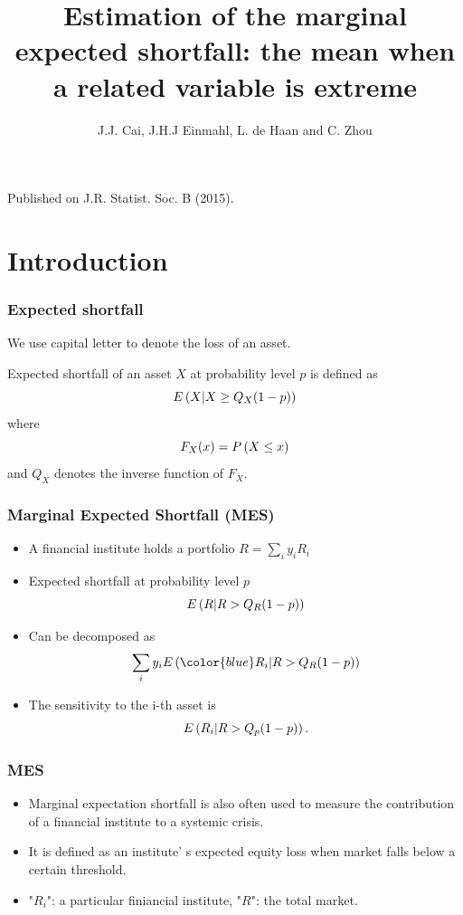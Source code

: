 \documentclass{beamer}
\author{J.J. Cai, J.H.J Einmahl, L. de Haan 
and C. Zhou}
\date{}
\title{Estimation of the marginal expected shortfall: the
mean when a related variable is extreme}
\begin{document}
\begin{frame}
\titlepage
\vspace{-10ex}
\begin{center}
    Published on J.R. Statist. Soc. B (2015).

    \vspace{3ex}
\end{center}
\end{frame}


\section{Introduction}
\begin{frame}
    \frametitle{Expected shortfall}
We use capital letter to denote the loss of an asset.

    \bigskip
    Expected shortfall of an asset $X$ at probability level $p$ is defined as 
    $$
      E\left(X|X\ge Q_{X}(1-p)\right)
    $$
where
$$
F_X(x) = P\left(X\le x\right)
$$
and $Q_{X}$ denotes the inverse function of $F_X$.
    

\end{frame}


\begin{frame}
    \frametitle{Marginal Expected Shortfall (MES)}
\begin{itemize}
    \item A financial institute holds a portfolio $R = \sum_{i} y_i R_i$
    \item Expected shortfall at probability level $p$
    $$
      E\left(R|R>Q_R(1-p)\right)
    $$
    \item Can be decomposed as 
    $$
        \sum_{i} y_i E\suit{{\color{blue} R_i}|R>Q_{R}(1-p)}
    $$
    \item The sensitivity to the i-th asset is
    $$
    E\left(R_i|R>Q_{p}(1-p)\right).
    $$
\end{itemize}
    

\end{frame}

\begin{frame}
    \frametitle{MES}
    \begin{itemize}
        \item Marginal expectation shortfall is also often used to measure the contribution of a financial institute to a systemic crisis.
        \medskip

        \item It is defined as  an institute' s expected equity loss when market falls below a certain threshold.
        
        \medskip
        \item "$R_i$": a particular finiancial institute, "$R$": the total market. 
    \end{itemize}
    

\end{frame}
\end{document}
